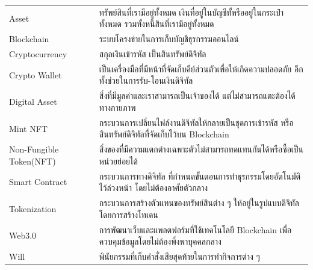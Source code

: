 \documentclass[12pt,oneside,openright,a4paper]{cpe-thai-project}
\begin{document}
%
\listofvocab
\begin{flushleft}
\begin{tabular}{@{}p{1in}@{=\extracolsep{0.5in}}l}
Asset & ทรัพย์สินที่เรามีอยู่ทั้งหมด  เงินที่อยู่ในบัญชีทั้หรืออยู่ในกระเป๋าทั้งหมด รวมทั้งหนี้สินที่เรามีอยู่ทั้งหมด \\
Blockchain & ระบบโครงข่ายในการเก็บบัญชีธุรกรรมออนไลน์ \\
Cryptocurrency & สกุลเงินเข้ารหัส เป็นสินทรัพย์ดิจิทัล \\
Crypto Wallet & เป็นเครื่องมือที่มีหน้าที่จัดเก็บคีย์ส่วนตัวเพื่อให้เกิดความปลอดภัย อีกทั้งช่วยในการรับ-โอนเงินดิจิทัล\\
Digital Asset & สิ่งที่มีมูลค่าและเราสามารถเป็นเจ้าของได้ แต่ไม่สามารถแตะต้องได้ทางกายภาพ\\
Mint NFT & กระบวนการเปลี่ยนไฟล์งานดิจิทัลให้กลายเป็นชุดการเข้ารหัส หรือสินทรัพย์ดิจิทัลที่จัดเก็บไว้บน Blockchain \\
Non-Fungible Token(NFT) & สิ่งของที่มีความแตกต่างเฉพาะตัวไม่สามารถทดแทนกันได้หรือซื้อเป็นหน่วยย่อยได้\\
Smart Contract & กระบวนการทางดิจิทัล ที่กำหนดขั้นตอนการทำธุรกรรมโดยอัตโนมัติไว้ล่วงหน้า โดยไม่ต้องอาศัยตัวกลาง\\
Tokenization &  กระบวนการสร้างตัวแทนของทรัพย์สินต่าง ๆ ให้อยู่ในรูปแบบดิจิทัลโดยการสร้างโทเคน\\
Web3.0 & การพัฒนาเว็บและแพลตฟอร์มที่ใช้เทคโนโลยี Blockchain เพื่อควบคุมข้อมูลโดยไม่ต้องพึ่งพาบุคคลกลาง\\
Will  & พินัยกรรมที่เก็บคำสั่งเสียสุดท้ายในการทำกิจการต่าง ๆ \\

\end{tabular}
\end{flushleft}


\end{document}
